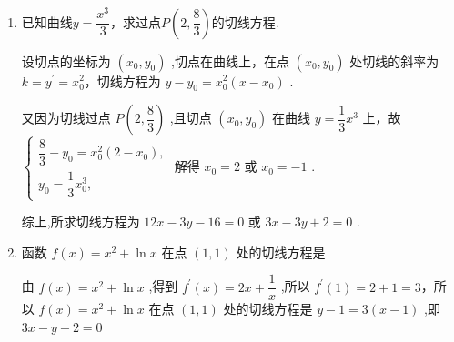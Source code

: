 \begin{enumerate}
\begin{enumerate}
        \item 已知曲线$y = \dfrac{x^3}{3}$，求过点$P\left(2, \dfrac{8}{3}\right)$的切线方程.
        \begin{jieda}
            设切点的坐标为 $\left( {{x}_{0},{y}_{0}}\right)$ ,切点在曲线上，在点 $\left( {{x}_{0},{y}_{0}}\right)$ 处切线的斜率为 $k = {y}^{\prime } = {x}_{0}^{2}$，切线方程为 $y - {y}_{0} = {x}_{0}^{2}\left( {x - {x}_{0}}\right)$ .
            
            又因为切线过点 $P\left( {2,\dfrac{8}{3}}\right)$ ,且切点 $\left( {{x}_{0},{y}_{0}}\right)$ 在曲线 $y = \dfrac{1}{3}{x}^{3}$ 上，故$\left\{  \begin{array}{l} \dfrac{8}{3} - {y}_{0} = {x}_{0}^{2}\left( {2 - {x}_{0}}\right) , \\  {y}_{0} = \dfrac{1}{3}{x}_{0}^{3}, \end{array}\right.$ 解得 ${x}_{0} = 2$ 或 ${x}_{0} =  - 1$ .
            综上,所求切线方程为 ${12x} - {3y} - {16} = 0$ 或 ${3x} - {3y} + 2 = 0$ .
        \end{jieda}
        
        \item 函数 $f\left( x\right)  = {x}^{2} + \ln x$ 在点 $\left( {1,1}\right)$ 处的切线方程是
        \begin{jieda}
            由 $f\left( x\right)  = {x}^{2} + \ln x$ ,得到 ${f}^{\prime }\left( x\right)  = {2x} + \dfrac{1}{x}$ ,所以 ${f}^{\prime }\left( 1\right)  = 2 + 1 = 3$，所以 $f\left( x\right)  = {x}^{2} + \ln x$ 在点 $\left( {1,1}\right)$ 处的切线方程是 $y - 1 = 3\left( {x - 1}\right)$ ,即 ${3x} - y - 2 = 0$
        \end{jieda}
        

\end{enumerate}
\end{enumerate}
